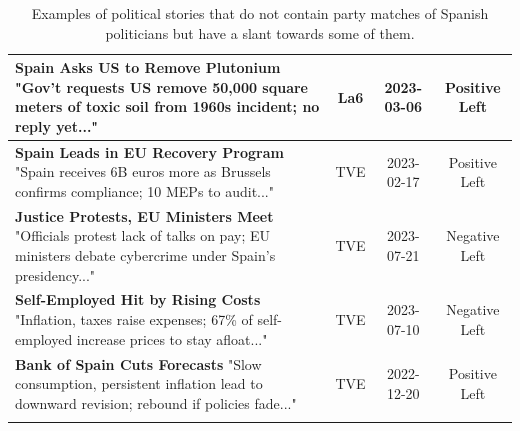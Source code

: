 \documentclass[12pt]{article}
\begin{document}
\begin{longtable}{|p{8cm}|c|c|c|}
	\hline
	\textbf{Spain Asks US to Remove Plutonium} \newline
	"Gov’t requests US remove 50,000 square meters of toxic soil from 1960s incident; no reply yet..." & La6 & 2023-03-06 & Positive Left \\
	\hline
	\textbf{Spain Leads in EU Recovery Program} \newline
	"Spain receives 6B euros more as Brussels confirms compliance; 10 MEPs to audit..." & TVE & 2023-02-17 & Positive Left \\
	\hline
	\textbf{Justice Protests, EU Ministers Meet} \newline
	"Officials protest lack of talks on pay; EU ministers debate cybercrime under Spain’s presidency..." & TVE & 2023-07-21 & Negative Left \\
	\hline
	\textbf{Self-Employed Hit by Rising Costs} \newline
	"Inflation, taxes raise expenses; 67\% of self-employed increase prices to stay afloat..." & TVE & 2023-07-10 & Negative Left \\
	\hline
	\textbf{Bank of Spain Cuts Forecasts} \newline
	"Slow consumption, persistent inflation lead to downward revision; rebound if policies fade..." & TVE & 2022-12-20 & Positive Left \\
	\hline
	\caption{Examples of political stories that do not contain party matches of Spanish politicians but have a slant towards some of them.}
	\label{tab:international}
\end{longtable}
\end{document}
